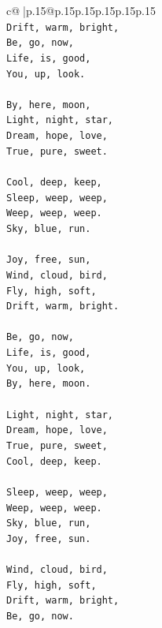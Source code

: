 \documentclass{article}
\begin{document}
{\begin{supertabular}{c@{$\;$}|p{.15\linewidth}@{}p{.15\linewidth}p{.15\linewidth}p{.15\linewidth}p{.15\linewidth}p{.15\linewidth}}
{{{\\ 
\texttt{Drift, warm, bright,} \\
\texttt{Be, go, now,} \\
\texttt{Life, is, good,} \\
\texttt{You, up, look.} \\
\\ 
\texttt{By, here, moon,} \\
\texttt{Light, night, star,} \\
\texttt{Dream, hope, love,} \\
\texttt{True, pure, sweet.} \\
\\ 
\texttt{Cool, deep, keep,} \\
\texttt{Sleep, weep, weep,} \\
\texttt{Weep, weep, weep.} \\
\texttt{Sky, blue, run.} \\
\\ 
\texttt{Joy, free, sun,} \\
\texttt{Wind, cloud, bird,} \\
\texttt{Fly, high, soft,} \\
\texttt{Drift, warm, bright.} \\
\\ 
\texttt{Be, go, now,} \\
\texttt{Life, is, good,} \\
\texttt{You, up, look,} \\
\texttt{By, here, moon.} \\
\\ 
\texttt{Light, night, star,} \\
\texttt{Dream, hope, love,} \\
\texttt{True, pure, sweet,} \\
\texttt{Cool, deep, keep.} \\
\\ 
\texttt{Sleep, weep, weep,} \\
\texttt{Weep, weep, weep.} \\
\texttt{Sky, blue, run,} \\
\texttt{Joy, free, sun.} \\
\\ 
\texttt{Wind, cloud, bird,} \\
\texttt{Fly, high, soft,} \\
\texttt{Drift, warm, bright,} \\
\texttt{Be, go, now.} \\
\\ 
}}}
\end{supertabular}}
\end{document}

